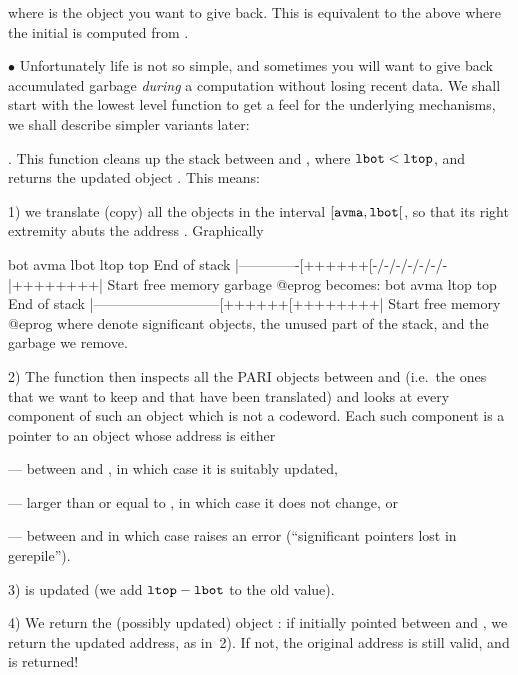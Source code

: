 
\noindent where  is the object you want to give back. This is
equivalent to the above where the initial  is computed from .

\noindent$\bullet$
Unfortunately life is not so simple, and sometimes you will want
to give back accumulated garbage \emph{during} a computation without losing
recent data. We shall start with the lowest level function to get a feel for
the underlying mechanisms, we shall describe simpler variants later:

. This function cleans
up the stack between  and , where ${\tt lbot} <
{\tt ltop}$, and returns the updated object . This means:

1) we translate (copy) all the objects in the interval
$[{\tt avma}, {\tt lbot}[$, so that its right extremity abuts the address
. Graphically

\vbox{\bprog
             bot           avma   lbot          ltop     top
End of stack  |-------------[++++++[-/-/-/-/-/-/-|++++++++|  Start
                free memory            garbage
@eprog
\noindent becomes:
\bprog
             bot                         avma   ltop     top
End of stack  |---------------------------[++++++[++++++++|  Start
                       free memory
@eprog
}
\noindent where \kbd{++} denote significant objects, \kbd{--} the unused part
of the stack, and \kbd{-/-} the garbage we remove.

2) The function then inspects all the PARI objects between  and
 (i.e.~the ones that we want to keep and that have been translated)
and looks at every component of such an object which is not a codeword. Each
such component is a pointer to an object whose address is either

--- between  and , in which case it is suitably updated,

--- larger than or equal to , in which case it does not change, or

--- between  and  in which case 
raises an error (``significant pointers lost in gerepile'').

3)  is updated (we add ${\tt ltop} - {\tt lbot}$ to the old value).

4) We return the (possibly updated) object : if  initially
pointed between  and , we return the updated address, as
in~2). If not, the original address is still valid, and is returned!

